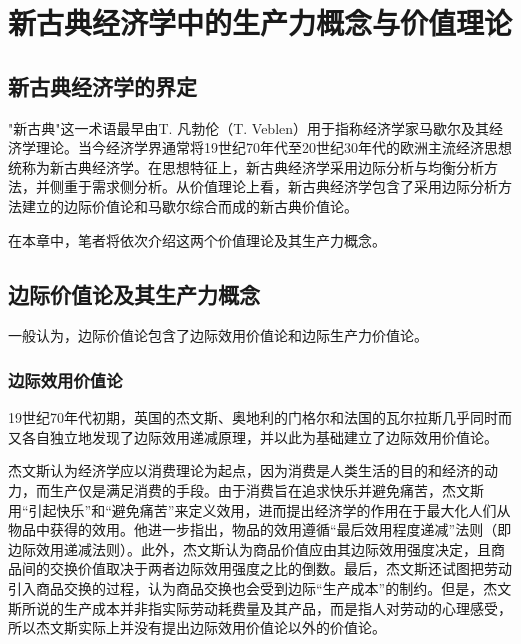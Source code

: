 
\chapter{新古典经济学中的生产力概念与价值理论}

\section{新古典经济学的界定}

"新古典"这一术语最早由T. 凡勃伦（T. Veblen）用于指称经济学家马歇尔及其经济学理论\cite[9382]{macmillanpublishersltdNewPalgraveDictionary2018}。当今经济学界通常将19世纪70年代至20世纪30年代的欧洲主流经济思想统称为新古典经济学\cite[241]{YanZhiJieXiFangJingJiXueShuoShiJiaoChengDiErBan2013}。在思想特征上，新古典经济学采用边际分析与均衡分析方法，并侧重于需求侧分析。从价值理论上看，新古典经济学包含了采用边际分析方法建立的边际价值论和马歇尔综合而成的新古典价值论\cite[181-184]{CaiJiMingCongGuDianZhengZhiJingJiXueDaoZhongGuoTeSeSheHuiZhuYiZhengZhiJingJiXueJiYuZhongGuoShiJiaoDeZhengZhiJingJiXueYanBianShangCe2023}。

在本章中，笔者将依次介绍这两个价值理论及其生产力概念。

\section{边际价值论及其生产力概念}

一般认为，边际价值论包含了边际效用价值论和边际生产力价值论\cite[181]{CaiJiMingCongGuDianZhengZhiJingJiXueDaoZhongGuoTeSeSheHuiZhuYiZhengZhiJingJiXueJiYuZhongGuoShiJiaoDeZhengZhiJingJiXueYanBianShangCe2023}。

\subsection{边际效用价值论}

19世纪70年代初期，英国的杰文斯、奥地利的门格尔和法国的瓦尔拉斯几乎同时而又各自独立地发现了边际效用递减原理，并以此为基础建立了边际效用价值论\cite[iii]{r.d.c.BuLaiKeJingJiXueDeBianJiGeMingShuoMingHePingJie2020}\cite[242]{YanZhiJieXiFangJingJiXueShuoShiJiaoChengDiErBan2013}。

杰文斯认为经济学应以消费理论为起点，因为消费是人类生活的目的和经济的动力，而生产仅是满足消费的手段。由于消费旨在追求快乐并避免痛苦，杰文斯用“引起快乐”和“避免痛苦”来定义效用，进而提出经济学的作用在于最大化人们从物品中获得的效用。他进一步指出，物品的效用遵循“最后效用程度递减”法则（即边际效用递减法则）。此外，杰文斯认为商品价值应由其边际效用强度决定，且商品间的交换价值取决于两者边际效用强度之比的倒数。最后，杰文斯还试图把劳动引入商品交换的过程，认为商品交换也会受到边际“生产成本”的制约。但是，杰文斯所说的生产成本并非指实际劳动耗费量及其产品，而是指人对劳动的心理感受，所以杰文斯实际上并没有提出边际效用价值论以外的价值论。\cite[125-136，142-149]{YanZhiJieCongBianJiGeMingDaoKaiEnSiGeMing2022}\cite[52-131]{SiTanLi*JieWenSiZhengZhiJingJiXueLiLun1984}

